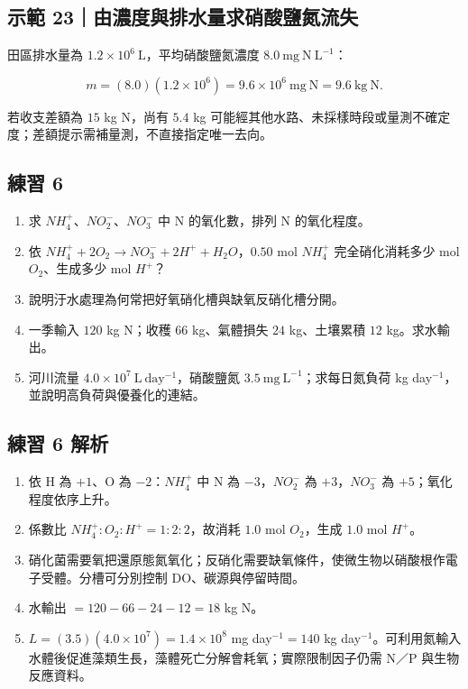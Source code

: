 \documentclass[11pt,a4paper]{article}
\providecommand{\tightlist}{%
  \setlength{\itemsep}{0pt}\setlength{\parskip}{0pt}}
\begin{document}
\begin{HandoutWorkedExample}

\subsection{示範 23｜由濃度與排水量求硝酸鹽氮流失}\label{ux793aux7bc4-23ux7531ux6fc3ux5ea6ux8207ux6392ux6c34ux91cfux6c42ux785dux9178ux9e7dux6c2eux6d41ux5931}

田區排水量為 \(1.2\times10^6\ \mathrm{L}\)，平均硝酸鹽氮濃度 \(8.0\ \mathrm{mg\ N\ L^{-1}}\)：

\[
m=(8.0)(1.2\times10^6)=9.6\times10^6\ \mathrm{mg\ N}=9.6\ \mathrm{kg\ N}.
\]

若收支差額為 \(15\) kg N，尚有 \(5.4\) kg 可能經其他水路、未採樣時段或量測不確定度；差額提示需補量測，不直接指定唯一去向。

\end{HandoutWorkedExample}

\subsection{練習 6}\label{ux7df4ux7fd2-6}

\begin{enumerate}
\def\labelenumi{\arabic{enumi}.}
\tightlist
\item
  求 \(NH_4^+\)、\(NO_2^-\)、\(NO_3^-\) 中 N 的氧化數，排列 N 的氧化程度。
\item
  依 \(NH_4^++2O_2\rightarrow NO_3^-+2H^++H_2O\)，\(0.50\) mol \(NH_4^+\) 完全硝化消耗多少 mol \(O_2\)、生成多少 mol \(H^+\)？
\item
  說明汙水處理為何常把好氧硝化槽與缺氧反硝化槽分開。
\item
  一季輸入 \(120\) kg N；收穫 \(66\) kg、氣體損失 \(24\) kg、土壤累積 \(12\) kg。求水輸出。
\item
  河川流量 \(4.0\times10^7\ \mathrm{L\ day^{-1}}\)，硝酸鹽氮 \(3.5\ \mathrm{mg\ L^{-1}}\)；求每日氮負荷 kg day\(^{-1}\)，並說明高負荷與優養化的連結。
\end{enumerate}

\subsection{練習 6 解析}\label{ux7df4ux7fd2-6-ux89e3ux6790}

\begin{enumerate}
\def\labelenumi{\arabic{enumi}.}
\tightlist
\item
  依 H 為 \(+1\)、O 為 \(-2\)：\(NH_4^+\) 中 N 為 \(-3\)，\(NO_2^-\) 為 \(+3\)，\(NO_3^-\) 為 \(+5\)；氧化程度依序上升。
\item
  係數比 \(NH_4^+:O_2:H^+=1:2:2\)，故消耗 \(1.0\) mol \(O_2\)，生成 \(1.0\) mol \(H^+\)。
\item
  硝化菌需要氧把還原態氮氧化；反硝化需要缺氧條件，使微生物以硝酸根作電子受體。分槽可分別控制 DO、碳源與停留時間。
\item
  水輸出 \(=120-66-24-12=18\) kg N。
\item
  \(L=(3.5)(4.0\times10^7)=1.4\times10^8\) mg day\(^{-1}=140\) kg day\(^{-1}\)。可利用氮輸入水體後促進藻類生長，藻體死亡分解會耗氧；實際限制因子仍需 N／P 與生物反應資料。
\end{enumerate}
\end{document}
